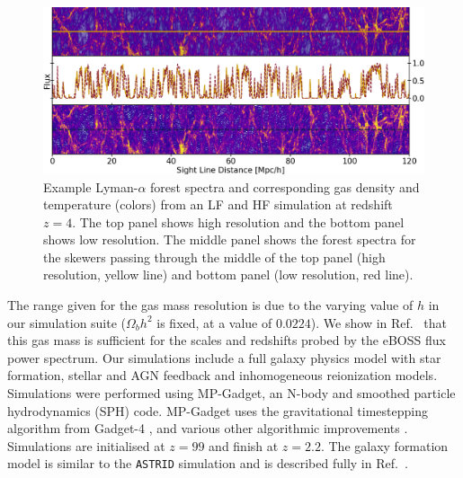 \begin{figure}
    \centering
    \includegraphics[width=\columnwidth]{figures/spectra_temp_simulation.png}
    \caption{\label{fig:spec_sim}
    Example Lyman-$\alpha$ forest spectra and corresponding gas density and temperature (colors) from an LF and HF simulation at redshift $z=4$.
    The top panel shows high resolution and the bottom panel shows low resolution. The middle panel shows the \lya forest spectra for the skewers passing through the middle of the top panel (high resolution, yellow line) and bottom panel (low resolution, red line).
    }
\end{figure}
The range given for the gas mass resolution is due to the varying value of $h$ in our simulation suite ($\Omega_b h^2$ is fixed, at a value of $0.0224$). We show in Ref.~\cite{2023simsuite} that this gas mass is sufficient for the scales and redshifts probed by the eBOSS flux power spectrum. Our simulations include a full galaxy physics model with star formation, stellar and AGN feedback and inhomogeneous reionization models. Simulations were performed using MP-Gadget\footnotemark, an N-body and smoothed particle hydrodynamics (SPH) code.
MP-Gadget uses the gravitational timestepping algorithm from Gadget-4 \cite{Springel:2021}, and various other algorithmic improvements \cite{2020JCAP...06..002B}.
Simulations are initialised at $z=99$ and finish at $z=2.2$. The galaxy formation model is similar to the \texttt{ASTRID} simulation \cite{2022MNRAS.512.3703B, 2022MNRAS.513..670N} and is described fully in Ref.~\cite{2023simsuite}.


